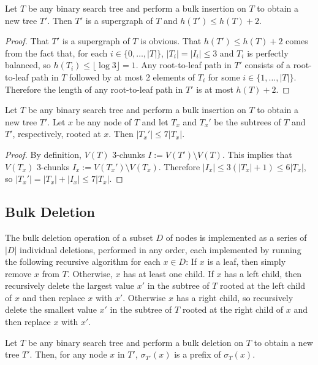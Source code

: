 \documentclass[kpfonts]{patmorin}
\let\le\leqslant
\begin{document}
\begin{lem}
  Let $T$ be any binary search tree and perform a bulk insertion on $T$ to obtain a new tree $T'$.  Then $T'$ is a supergraph of $T$ and $h(T')\le h(T)+2$.
\end{lem}

\begin{proof}
  That $T'$ is a supergraph of $T$ is obvious.  That $h(T')\le h(T)+2$ comes from the fact that, for each $i\in\{0,\ldots,|T|\}$, $|T_i|=|I_i|\le 3$ and $T_i$ is perfectly balanced, so $h(T_i)\le\lfloor\log 3\rfloor = 1$. Any root-to-leaf path in $T'$ consists of a root-to-leaf path in $T$ followed by at most 2 elements of $T_i$ for some $i\in\{1,\ldots,|T|\}$.  Therefore the length of any root-to-leaf path in $T'$ is at most $h(T)+2$.
\end{proof}

\begin{lem}
  Let $T$ be any binary search tree and perform a bulk insertion on $T$ to obtain a new tree $T'$.  Let $x$ be any node of $T$ and let $T_x$ and $T_x'$ be the subtrees of $T$ and $T'$, respectively, rooted at $x$.  Then $|T_x'|\le 7|T_x|$.
\end{lem}

\begin{proof}
  By definition, $V(T)$ 3-chunks $I:=V(T')\setminus V(T)$.  This implies that $V(T_x)$ 3-chunks $I_x:=V(T_x')\setminus V(T_x)$.  Therefore $|I_x|\le 3(|T_x|+1)\le 6|T_x|$, so $|T_x'|=|T_x|+|I_x|\le 7|T_x|$.
\end{proof}


\subsection{Bulk Deletion}

The bulk deletion operation of a subset $D$ of nodes is implemented as a series of $|D|$ individual deletions, performed in any order, each implemented by running the following recursive algorithm for each $x\in D$:  If $x$ is a leaf, then simply remove $x$ from $T$.  Otherwise, $x$ has at least one child.  If $x$ has a left child, then recursively delete the largest value $x'$ in the subtree of $T$ rooted at the left child of $x$ and then replace $x$ with $x'$.  Otherwise $x$ has a right child, so recursively delete the smallest value $x'$ in the subtree of $T$ rooted at the right child of $x$ and then replace $x$ with $x'$.


\begin{lem}
  Let $T$ be any binary search tree and perform a bulk deletion on $T$ to obtain a new tree $T'$.  Then, for any node $x$ in $T'$, $\sigma_{T'}(x)$ is a prefix of $\sigma_T(x)$.
\end{lem}
\end{document}
